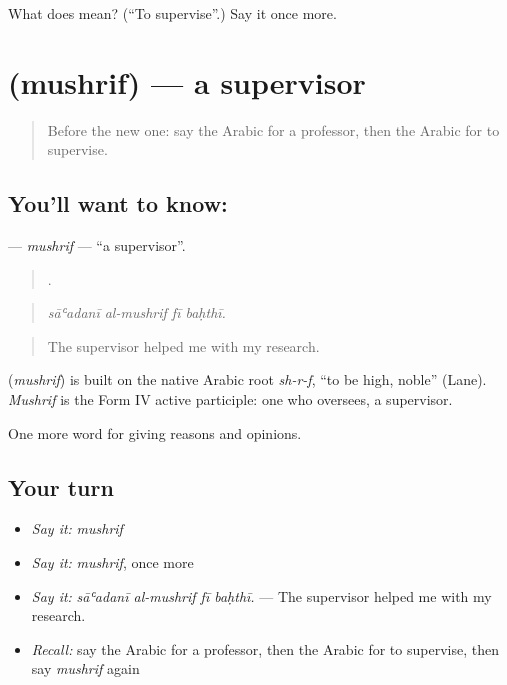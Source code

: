 \begin{tcolorbox}[breakable,colback=teal!4,colframe=teal!35!black,title={Before you move on}]
What does  mean? (\textquotedblleft{}To supervise\textquotedblright{}.) Say it once more.
\end{tcolorbox}
\section[\texorpdfstring{\ar{مشرف} (mushrif)}{مشرف (mushrif)}]{ (mushrif) — a supervisor}

\label{lesson:AR-C392-mushrif}



\begin{quote}
Before the new one: say the Arabic for a professor, then the Arabic for to supervise.
\end{quote}

\subsection*{You'll want to know: }
\textbf{} — \emph{mushrif} — \textquotedblleft{}a supervisor\textquotedblright{}.

\begin{quote}
   .
\end{quote}

\begin{quote}
\emph{sāʿadanī al-mushrif fī baḥthī.}
\end{quote}

\begin{quote}
The supervisor helped me with my research.
\end{quote}

\begin{cousinweb}
\textbf{} (\emph{mushrif}) is built on the native Arabic root \emph{sh-r-f}, \textquotedblleft{}to be high, noble\textquotedblright{} (Lane). \emph{Mushrif} is the Form IV active participle: one who oversees, a supervisor.
\end{cousinweb}

\begin{grammarlens}[title={What you've built}]
One more word for giving reasons and opinions.
\end{grammarlens}

\subsection*{Your turn}
\begin{itemize}
\raggedright
  \item \emph{Say it:} \emph{mushrif}
  \item \emph{Say it:} \emph{mushrif}, once more
  \item \emph{Say it:} \emph{sāʿadanī al-mushrif fī baḥthī.} — The supervisor helped me with my research.
  \item \emph{Recall:} say the Arabic for a professor, then the Arabic for to supervise, then say \emph{mushrif} again
\end{itemize}


